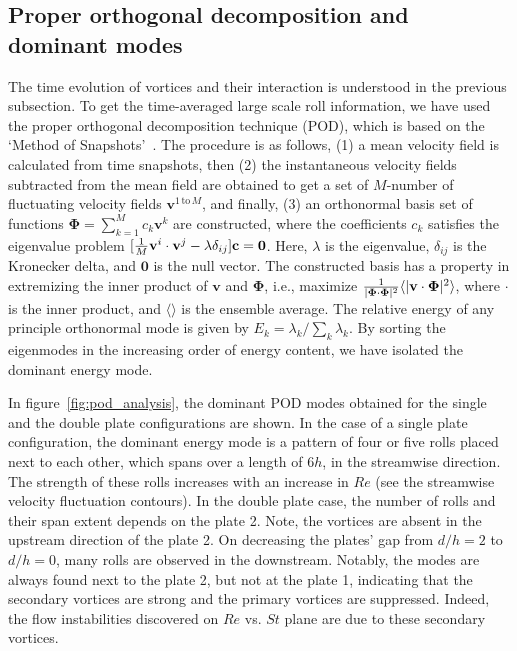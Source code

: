 \documentclass[aps,pre,twocolumn,aps,longbibliography]{revtex4-1}
\begin{document}
	
	\subsection{Proper orthogonal decomposition and dominant modes}
	
	
	The time evolution of vortices and their interaction is understood in the previous subsection. To get the time-averaged large scale roll information, we have used the proper orthogonal decomposition technique (POD), which is based on the `Method of Snapshots'~\cite{Holmes2012}. The procedure is as follows, (1) a mean velocity field is calculated from time snapshots, then (2) the instantaneous velocity fields subtracted from the mean field are obtained to get a set of $M$-number of fluctuating velocity fields $\mathbf{v}^{1\, \text{to}\, M}$, and finally, (3) an orthonormal basis set of functions $\mathbf{\Phi}=\sum_{k=1}^{M} c_k\mathbf{v}^k$ are constructed, where the coefficients $c_k$ satisfies the eigenvalue problem 
	$[{1\over M}\mathbf{v}^i\cdot\mathbf{v}^j-\lambda \delta_{ij}]\mathbf{c}=\mathbf{0}$. Here, $\lambda$ is the eigenvalue, $\delta_{ij}$ is the Kronecker delta, and $\mathbf{0}$ is the null vector. The constructed basis has a property in extremizing the inner product of $\mathbf{v}$ and $\mathbf{\Phi}$, i.e., maximize ${1\over{|\mathbf{\Phi}\cdot\mathbf{\Phi}|^2}}\langle{|\mathbf{v}\cdot\mathbf{\Phi}|^2}\rangle$, where $\cdot$ is the inner product, and $\langle\rangle$ is the ensemble average. The relative energy of any principle orthonormal mode is given by $E_k=\lambda_k/{\sum_k \lambda_k}$. By sorting the eigenmodes in the increasing order of energy content, we have isolated the dominant energy mode. 
	
	
	In figure~\ref{fig:pod_analysis}, the dominant POD modes obtained for the single and the double plate configurations are shown. In the case of a single plate configuration, the dominant energy mode is a pattern of four or five rolls placed next to each other, which spans over a length of $6h$, in the streamwise direction. The strength of these rolls increases with an increase in $Re$ (see the streamwise velocity fluctuation contours). In the double plate case, the number of rolls and their span extent depends on the plate 2. Note, the vortices are absent in the upstream direction of the plate 2. On decreasing the plates' gap from $d/h=2$ to $d/h=0$, many rolls are observed in the downstream. Notably, the modes are always found next to the plate 2, but not at the plate 1, indicating that the secondary vortices are strong and the primary vortices are suppressed. Indeed, the flow instabilities discovered on $Re$ vs. $St$ plane are due to these secondary vortices.
	
\end{document}
